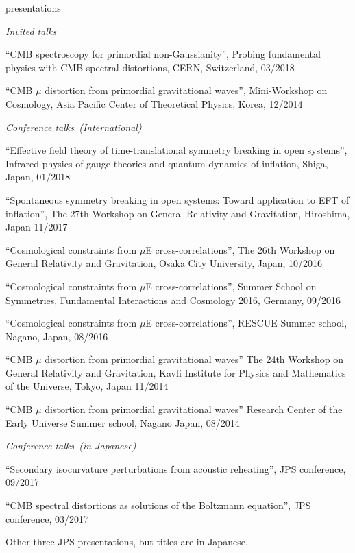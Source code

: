 \documentclass[a4paper]{resume} %
\begin{document}
\begin{rSection}{presentations}

\noindent\textit{Invited talks}
\begin{etaremune}
	 \item
``CMB spectroscopy for primordial non-Gaussianity'', Probing fundamental physics with CMB spectral distortions, CERN, Switzerland, 03/2018
    \item 
``CMB $\mu$ distortion from primordial gravitational waves'', Mini-Workshop on Cosmology, Asia Pacific Center of Theoretical Physics, Korea, 12/2014
\end{etaremune}

\noindent\textit{Conference talks~(International)}

\begin{etaremune}
	\item
    ``Effective field theory of time-translational symmetry breaking in open systems'', Infrared physics of gauge theories and quantum dynamics of inflation, Shiga, Japan, 01/2018
    
    \item
    ``Spontaneous symmetry breaking in open systems: Toward application to EFT of inflation'', The 27th Workshop on General Relativity and Gravitation, Hiroshima, Japan 11/2017
    \item
    ``Cosmological constraints from $\mu$E cross-correlations'', The 26th Workshop on General Relativity and Gravitation, Osaka City University, Japan, 10/2016
    \item
    ``Cosmological constraints from $\mu$E cross-correlations'', Summer School on Symmetries, Fundamental Interactions and Cosmology 2016, Germany, 09/2016
    \item
    ``Cosmological constraints from $\mu$E cross-correlations'', RESCUE Summer school, Nagano, Japan, 08/2016
    \item
``CMB $\mu$ distortion from primordial gravitational waves'' The 24th Workshop on General Relativity and Gravitation, Kavli Institute for Physics and Mathematics of the Universe, Tokyo, Japan 11/2014     
    \item 
    ``CMB $\mu$ distortion from primordial gravitational waves'' Research Center of the Early Universe Summer school, Nagano Japan, 08/2014
    
        
\end{etaremune}

\noindent\textit{Conference talks~(in Japanese)}

\begin{etaremune}
    \item 
    ``Secondary isocurvature perturbations from acoustic reheating'', JPS conference, 09/2017
    \item
    ``CMB spectral distortions as solutions of the Boltzmann equation'', JPS conference, 03/2017
    \item
    Other three JPS presentations, but titles are in Japanese.
\end{etaremune}



\end{rSection}
\end{document}
